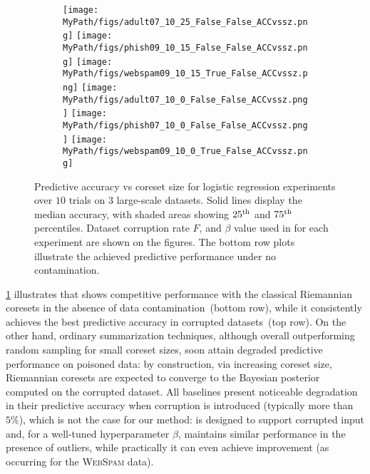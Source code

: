\begin{figure}[!tp]
	\begin{subfigure}[]{0.995\textwidth} 
		\centering
		\texttt{[image: \\MyPath/figs/adult07\_10\_25\_False\_False\_ACCvssz.png]}
		\centering
		\hfill
		\texttt{[image: \\MyPath/figs/phish09\_10\_15\_False\_False\_ACCvssz.png]}
		\centering
		\hfill
		\texttt{[image: \\MyPath/figs/webspam09\_10\_15\_True\_False\_ACCvssz.png]}
		\centering
		\texttt{[image: \\MyPath/figs/adult07\_10\_0\_False\_False\_ACCvssz.png]}
		\centering
		\hfill
		\texttt{[image: \\MyPath/figs/phish07\_10\_0\_False\_False\_ACCvssz.png]}
		\centering
		\hfill
		\texttt{[image: \\MyPath/figs/webspam09\_10\_0\_True\_False\_ACCvssz.png]}
	\end{subfigure}	
	\centering
	\caption{Predictive accuracy vs coreset size for logistic regression experiments over $10$ trials on $3$ large-scale datasets. Solid lines display the median accuracy, with shaded areas showing $25\textsuperscript{th}$ and $75\textsuperscript{th}$ percentiles. Dataset corruption rate $F$, and $\beta$ value used in \bcores{} for each experiment are shown on the figures. The bottom row plots illustrate the achieved predictive performance under no contamination.}
	\label{fig:logreg_plot}
\end{figure}

\cref{fig:logreg_plot} illustrates that \bcores{} shows competitive performance with the classical Riemannian coresets in the absence of data contamination~(bottom row), while it consistently achieves the best predictive accuracy in corrupted datasets~(top row).  On the other hand, ordinary summarization techniques, although overall outperforming random sampling for small coreset sizes, soon attain degraded predictive performance on poisoned data: by construction, via increasing coreset size, Riemannian coresets are expected to converge to the Bayesian posterior computed on the corrupted dataset. All baselines present noticeable degradation in their predictive accuracy when corruption is introduced (typically more than $5\%$), which is not the case for our method: \bcores{} is designed to support corrupted input and, for a well-tuned hyperparameter $\beta$, maintains similar performance in the presence of outliers, while practically it can even achieve improvement (as occurring for the \textsc{WebSpam} data).


